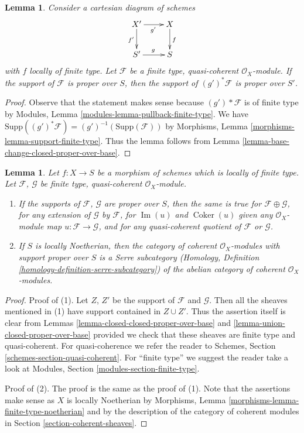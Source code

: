 \documentclass{stacks-project}
\theoremstyle{plain}
\newtheorem{lemma}[subsection]{Lemma}
\theoremstyle{definition}
\theoremstyle{remark}
\numberwithin{equation}{subsection}
\def\Im{\mathop{\mathrm{Im}}}
\def\Coker{\mathop{\mathrm{Coker}}}
\begin{document}
\begin{lemma}
\label{lemma-base-change-module-support-proper-over-base}
Consider a cartesian diagram of schemes
$$
\xymatrix{
X' \ar[d]_{f'} \ar[r]_{g'} & X \ar[d]^f \\
S' \ar[r]^g & S
}
$$
with $f$ locally of finite type. Let $\mathcal{F}$ be a
finite type, quasi-coherent $\mathcal{O}_X$-module.
If the support of $\mathcal{F}$ is proper over $S$, then
the support of $(g')^*\mathcal{F}$ is proper over $S'$.
\end{lemma}

\begin{proof}
Observe that the statement makes sense because
$(g')*\mathcal{F}$ is of finite type by
Modules, Lemma \ref{modules-lemma-pullback-finite-type}.
We have $\text{Supp}((g')^*\mathcal{F}) = (g')^{-1}(\text{Supp}(\mathcal{F}))$
by Morphisms, Lemma \ref{morphisms-lemma-support-finite-type}.
Thus the lemma follows from
Lemma \ref{lemma-base-change-closed-proper-over-base}.
\end{proof}

\begin{lemma}
\label{lemma-cat-module-support-proper-over-base}
Let $f : X \to S$ be a morphism of schemes which is locally
of finite type. Let $\mathcal{F}$, $\mathcal{G}$
be finite type, quasi-coherent $\mathcal{O}_X$-module.
\begin{enumerate}
\item If the supports of $\mathcal{F}$, $\mathcal{G}$
are proper over $S$, then the same is true
for $\mathcal{F} \oplus \mathcal{G}$, for any extension
of $\mathcal{G}$ by $\mathcal{F}$, for $\Im(u)$ and $\Coker(u)$
given any $\mathcal{O}_X$-module map $u : \mathcal{F} \to \mathcal{G}$,
and for any quasi-coherent quotient of $\mathcal{F}$ or $\mathcal{G}$.
\item If $S$ is locally Noetherian, then the category of
coherent $\mathcal{O}_X$-modules with support proper over
$S$ is a Serre subcategory (Homology, Definition
\ref{homology-definition-serre-subcategory})
of the abelian category of
coherent $\mathcal{O}_X$-modules.
\end{enumerate}
\end{lemma}

\begin{proof}
Proof of (1). Let $Z$, $Z'$ be the support of $\mathcal{F}$
and $\mathcal{G}$. Then all the sheaves mentioned in (1)
have support contained in $Z \cup Z'$. Thus the assertion itself
is clear from Lemmas \ref{lemma-closed-closed-proper-over-base} and
\ref{lemma-union-closed-proper-over-base}
provided we check that these sheaves are finite type
and quasi-coherent. For quasi-coherence we refer the reader to
Schemes, Section \ref{schemes-section-quasi-coherent}.
For ``finite type'' we suggest the reader take a look at
Modules, Section \ref{modules-section-finite-type}.

\medskip\noindent
Proof of (2). The proof is the same as the proof of (1). Note that
the assertions make sense as $X$ is locally Noetherian by
Morphisms, Lemma \ref{morphisms-lemma-finite-type-noetherian}
and by the description of the category of coherent
modules in Section \ref{section-coherent-sheaves}.
\end{proof}
\end{document}
